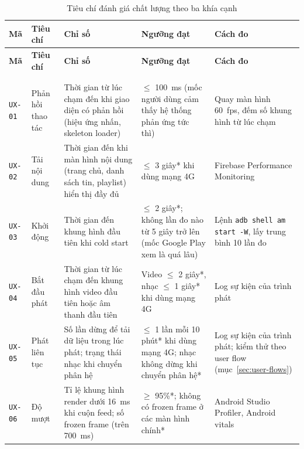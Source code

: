 \begingroup
\small
\begin{longtable}{@{}>{\raggedright\arraybackslash}p{1.2cm}>{\raggedright\arraybackslash}p{2.4cm}>{\raggedright\arraybackslash}p{4.2cm}>{\raggedright\arraybackslash}p{3.7cm}>{\raggedright\arraybackslash}p{3.5cm}@{}}
\caption{Tiêu chí đánh giá chất lượng theo ba khía cạnh}
\label{tab:quality-criteria} \\
\toprule
\textbf{Mã} & \textbf{Tiêu chí} & \textbf{Chỉ số} & \textbf{Ngưỡng đạt} & \textbf{Cách đo} \\
\midrule
\endfirsthead
\toprule
\textbf{Mã} & \textbf{Tiêu chí} & \textbf{Chỉ số} & \textbf{Ngưỡng đạt} & \textbf{Cách đo} \\
\midrule
\endhead
\bottomrule
\endfoot
\bottomrule
\multicolumn{5}{@{}l}{\footnotesize *~Ngưỡng do nhóm tự đặt.} \\
\endlastfoot
\multicolumn{5}{@{}l}{\textit{User Experience}} \\
\texttt{UX-01} & Phản hồi thao tác & Thời gian từ lúc chạm đến khi giao diện có phản hồi (hiệu ứng nhấn, skeleton loader) & $\le$ 100~ms (mốc người dùng cảm thấy hệ thống phản ứng tức thì)~\cite{nielsen-response-times} & Quay màn hình 60~fps, đếm số khung hình từ lúc chạm \\
\texttt{UX-02} & Tải nội dung & Thời gian đến khi màn hình nội dung (trang chủ, danh sách tin, playlist) hiển thị đầy đủ & $\le$ 3 giây* khi dùng mạng 4G & Firebase Performance Monitoring \\
\texttt{UX-03} & Khởi động & Thời gian đến khung hình đầu tiên khi cold start & $\le$ 2 giây*; không lần đo nào từ 5 giây trở lên (mốc Google Play xem là quá lâu)~\cite{android-launch-time} & Lệnh \texttt{adb shell am start -W}, lấy trung bình 10 lần đo \\
\texttt{UX-04} & Bắt đầu phát & Thời gian từ lúc chạm đến khung hình video đầu tiên hoặc âm thanh đầu tiên & Video $\le$ 2 giây*, nhạc $\le$ 1 giây* khi dùng mạng 4G & Log sự kiện của trình phát \\
\texttt{UX-05} & Phát liên tục & Số lần dừng để tải dữ liệu trong lúc phát; trạng thái nhạc khi chuyển phân hệ & $\le$ 1 lần mỗi 10 phút* khi dùng mạng 4G; nhạc không dừng khi chuyển phân hệ* & Log sự kiện của trình phát; kiểm thử theo user flow (mục~\ref{sec:user-flows}) \\
\texttt{UX-06} & Độ mượt & Tỉ lệ khung hình render dưới 16~ms khi cuộn feed; số frozen frame (trên 700~ms)~\cite{android-render} & $\ge$ 95\%*; không có frozen frame ở các màn hình chính* & Android Studio Profiler, Android vitals \\

\end{longtable}
